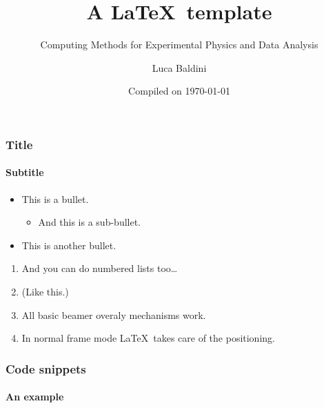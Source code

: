 \documentclass[9pt]{beamer}
\title{A \LaTeX\ template}
\subtitle{Computing Methods for Experimental Physics and Data Analysis}
\date{Compiled on \today}
\author{Luca Baldini}
\institute[UNIPI and INFN]{Universit\`a and INFN--Pisa}
\begin{document}
\titleframe


\begin{frame}
  \frametitle{Title}
  \framesubtitle{Subtitle}
  \begin{itemize}
  \item This is a bullet.
    \begin{itemize}
    \item And this is a sub-bullet.
    \end{itemize}
  \item This is another bullet.
  \end{itemize}
  \begin{enumerate}
  \item And you can do numbered lists too\ldots
  \item (Like this.)
  \item<2> All basic beamer overaly mechanisms work.
  \item<2> In normal frame mode \LaTeX\ takes care of the positioning.
  \end{enumerate}
\end{frame}


\begin{frame}
  \frametitle{Code snippets}
  \framesubtitle{An example}

  
\end{frame}
\end{document}
